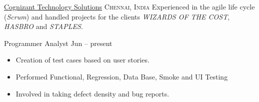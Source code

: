 
\headedsection  %
  {\href{https://www.cognizant.com}{Cognizant Technology Solutions}}
  {\textsc{Chennai, India}} 
  {\newline{}Experienced in the agile life cycle (\emph{Scrum}) and handled projects for the clients  \emph{WIZARDS OF THE COST}, \emph{HASBRO} and \emph{STAPLES}.
} 
  {%
  \headedsubsection
    {Programmer Analyst}
    {Jun  -- present}
    {\begin{itemize}
        \item Creation of test cases based on user stories. 
        \item Performed Functional, Regression, Data Base, Smoke and UI Testing
        \item Involved in taking defect density and bug reports. 
    \end{itemize}
    }
}
